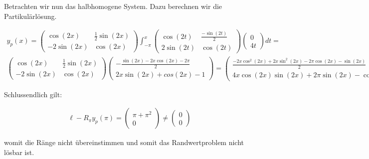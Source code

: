 \begin{solution}
\begin{enumerate}[label = \textbf{\alph*)}]
  Betrachten wir nun das halbhomogene System. Dazu berechnen wir die Partikulärlösung.

  \begin{align*}
    y_p(x)
    =
    \begin{pmatrix}
    \cos(2x) & \frac{1}{2}\sin(2x) \\
    -2\sin(2x) & \cos(2x)
    \end{pmatrix}
    \int_{-\pi}^x \begin{pmatrix}
      \cos(2t) & \frac{-\sin(2t)}{2} \\
      2\sin(2t) & \cos(2t)
    \end{pmatrix}
    \begin{pmatrix}
      0 \\
      4t
    \end{pmatrix}
    dt = \\
    \begin{pmatrix}
    \cos(2x) & \frac{1}{2}\sin(2x) \\
    -2\sin(2x) & \cos(2x)
    \end{pmatrix}
    \begin{pmatrix}
      -\frac{\sin(2x)-2x\cos(2x) - 2\pi}{2} \\
      2x\sin(2x)+cos(2x)-1
    \end{pmatrix}
    =
    \begin{pmatrix}
      \frac{-2x\cos^2(2x)+2x\sin^2(2x)-2\pi \cos(2x)-\sin(2x)}{2} \\
      4x \cos(2x)\sin(2x) + 2\pi \sin(2x)-\cos(2x) + 1
    \end{pmatrix}
  \end{align*}

  Schlussendlich gilt:

  \begin{align*}
    \ell - R_\pi y_p(\pi)=
    \begin{pmatrix}
      \pi + \pi^2 \\
      0
    \end{pmatrix}
    \neq
    \begin{pmatrix}
      0 \\ 0
    \end{pmatrix}
  \end{align*}

    womit die Ränge nicht übereinstimmen und somit das Randwertproblem nicht lösbar ist.


\end{enumerate}
\end{solution}
